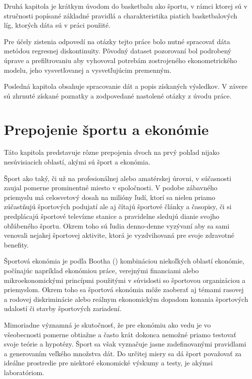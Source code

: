 \documentclass[
  digital, %
  twoside, %
  notable,   %
  lof,     %
  lot,     %
]{fithesis3}
\begin{document}
	Druhá kapitola je krátkym úvodom do basketbalu ako športu, v rámci ktorej sú v stručnosti popísané základné pravidlá a charakteristika piatich basketbalových líg, ktorých dáta sú v práci použité.
	
	Pre účely zistenia odpovedí na otázky tejto práce bolo nutné spracovať dáta metódou regresnej diskontinuity. Pôvodný dataset pozorovaní bol podrobený úprave a prefiltrovaniu aby vyhovoval potrebám zostrojeného ekonometrického modelu, jeho vysvetľovanej a vysvetľujúcim premenným.
	
	Posledná kapitola obsahuje spracovanie dát a popis získaných výsledkov. V závere sú zhrnuté získané poznatky a zodpovedané nastolené otázky z úvodu práce.
	

	\chapter{Prepojenie športu a ekonómie}
	Táto kapitola predstavuje rôzne prepojenia dvoch na prvý pohľad nijako nesúvisiacich oblastí, akými sú šport a ekonómia.
	
	Šport ako taký, či už na profesionálnej alebo amatérskej úrovni, v súčasnosti zaujal pomerne prominentné miesto v spoločnosti. V podobe zábavného priemyslu má celosvetový dosah na milióny ľudí, ktorí sa nielen priamo zúčastňujú športových podujatí ale aj čítajú športové články a časopisy, či si predplácajú športové televízne stanice a pravidelne sledujú dianie svojho obľúbeného športu. \parencite{conrad2011} Okrem toho sú ľudia denno-denne vyzývaní aby sa sami venovali nejakej športovej aktivite, ktorá je vyzdvihovaná pre svoje zdravotné benefity.
	
	Športová ekonómia je podľa Bootha (\citeyear[s.~377]{booth2009}) kombináciou niekoľkých oblastí ekonómie, počínajúc napríklad ekonómiou práce, verejnými financiami alebo mikroekonomickými princípmi použitými v súvislosti so športovou organizáciou a priemyslom. Okrem toho sa športová ekonómia môže zaoberať aj témami rasovej a rodovej diskriminácie alebo reálnym ekonomickým dopadom konania športových udalostí či stavby športových zariadení. 
	
	Mimoriadne významná je skutočnosť, že pre ekonómiu ako vedu je vo všeobecnosti pomerne obtiažne a často krát dokonca nemožné  priamo testovať svoje teórie a hypotézy. Šport sa však vyznačuje jasne zadefinovanými pravidlami a generovaním veľkého množstva dát. Do určitej miery sa dá šport považovať za ideálne prostredie pre niektoré ekonomické výskumy a testy, je akýmsi laboratóriom.
	
\end{document}
